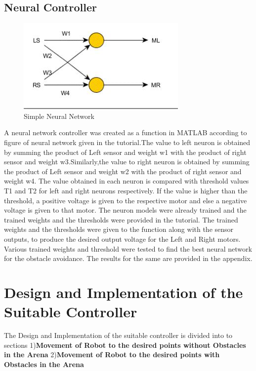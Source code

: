 \documentclass{l4proj}
\begin{document}
\subsection{Neural Controller}
\newline
\begin{figure}[htb]
    \centering
    \includegraphics[width=0.5\linewidth]{images/Neural Pic.JPG}

    \caption{Simple Neural Network
    }

    \label{fig:Rootlocus} 
\end{figure}
A neural network controller was created as a function in MATLAB according to figure of neural network given in the tutorial.The value to left neuron is obtained by summing the product of Left sensor and weight w1 with the product of right sensor and weight w3.Similarly,the value to right neuron is obtained by summing the product of Left sensor and weight w2 with the product of right sensor and weight w4. The value obtained in each neuron is compared with threshold values T1 and T2 for left and right neurons respectively. If the value is higher than the threshold, a positive voltage is given to the respective motor and else a negative voltage is given to that motor.  The neuron models were already trained and the trained weights and the thresholds were provided in the tutorial. The trained weights and the thresholds were given to the function along with the sensor outputs, to produce the desired output voltage for the Left and Right motors. Various trained weights and threshold were tested to find the best neural network for the obstacle avoidance. The results for the same are provided in the appendix.

\section{Design and Implementation of the Suitable Controller}
The Design and Implementation of the suitable controller is divided into to sections 1)\textbf{Movement of Robot to the desired points without Obstacles in the Arena} 2)\textbf{Movement of Robot to the desired points with Obstacles in the Arena}
\end{document}
